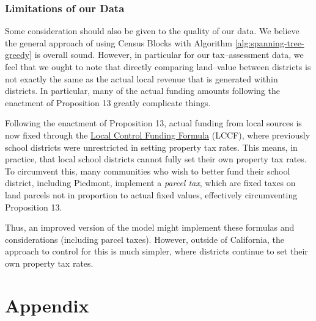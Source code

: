 \documentclass{article}
\begin{document}
\subsubsection{Limitations of our Data}
Some consideration should also be given to the quality of our data. We believe the general approach of using Census Blocks with Algorithm \ref{alg:spanning-tree-greedy} is overall sound. However, in particular for our tax--assessment data, we feel that we ought to note that directly comparing land--value between districts is not exactly the same as the actual local revenue that is generated within districts. In particular, many of the actual funding amounts following the enactment of Proposition 13 greatly complicate things.

Following the enactment of Proposition 13, actual funding from local sources is now fixed through the \href{https://www.cde.ca.gov/fg/aa/lc/lcffoverview.asp}{Local Control Funding Formula} (LCCF), where previously school districts were unrestricted in setting property tax rates. This means, in practice, that local school districts cannot fully set their own property tax rates. To circumvent this, many communities who wish to better fund their school district, including Piedmont, implement a \textit{parcel tax}, which are fixed taxes on land parcels not in proportion to actual fixed values, effectively circumventing Proposition 13.

Thus, an improved version of the model might implement these formulas and considerations (including parcel taxes). However, outside of California, the approach to control for this is much simpler, where districts continue to set their own property tax rates. 

\newpage
\section{Appendix}
\end{document}
